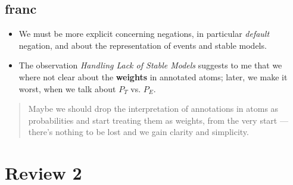 \documentclass{tlp}
\begin{document}
\subsection*{franc}
\begin{itemize}
  \item We must be more explicit concerning negations, in particular \textit{default} negation, and about the representation of events and stable models.
  \item The observation \emph{Handling Lack of Stable Models} suggests to me that we where not clear about the \textbf{weights} in annotated atoms; later, we make it worst, when we talk about $P_T$ vs. $P_E$. 
\end{itemize}
\begin{quote}
  Maybe we should drop the interpretation of annotations in atoms as probabilities and start treating them as weights, from the very start --- there's nothing to be lost and we gain clarity and simplicity.
\end{quote}

\section{Review 2}
\end{document}
